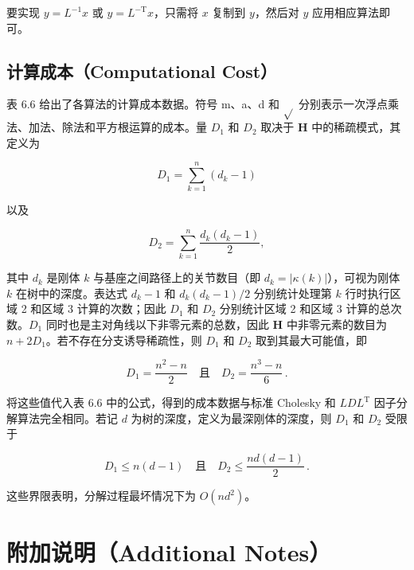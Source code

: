 \documentclass[10pt,a4paper]{book}
\theoremstyle{thmstyle} %
\theoremstyle{defstyle} %
\theoremstyle{prostyle} %
\begin{document}
要实现 $y = L^{-1}x$ 或 $y = L^{-\mathrm{T}}x$，只需将 $x$ 复制到 $y$，然后对 $y$ 应用相应算法即可。



\subsection{计算成本（Computational Cost）}





表 6.6 给出了各算法的计算成本数据。符号 m、a、d 和 $\sqrt{}$ 分别表示一次浮点乘法、加法、除法和平方根运算的成本。量 $D_{1}$ 和 $D_{2}$ 取决于 $\mathbf{H}$ 中的稀疏模式，其定义为



$$
D_{1} = \sum _ { k = 1 } ^{n} ( d _ { k } - 1 )
$$



以及



$$
D_{2} = \sum _ { k = 1 } ^{n} \frac { d _ { k } ( d _ { k } - 1 ) } { 2 } ,
$$



其中 $d_{k}$ 是刚体 $k$ 与基座之间路径上的关节数目（即 $d_{k}=|\kappa(k)|$），可视为刚体 $k$ 在树中的深度。表达式 $d_{k}-1$ 和 $d_{k}(d_{k}-1)/2$ 分别统计处理第 $k$ 行时执行区域 2 和区域 3 计算的次数；因此 $D_{1}$ 和 $D_{2}$ 分别统计区域 2 和区域 3 计算的总次数。$D_{1}$ 同时也是主对角线以下非零元素的总数，因此 $\mathbf{H}$ 中非零元素的数目为 $n+2D_{1}$。若不存在分支诱导稀疏性，则 $D_{1}$ 和 $D_{2}$ 取到其最大可能值，即



$$
D_{1} = \frac{n^{2} - n}{2} \quad \text{且} \quad D_{2} = \frac{n^{3} - n}{6} \, .
$$



将这些值代入表 6.6 中的公式，得到的成本数据与标准 Cholesky 和 $LDL^{\mathrm{T}}$ 因子分解算法完全相同。若记 $d$ 为树的深度，定义为最深刚体的深度，则 $D_{1}$ 和 $D_{2}$ 受限于



$$
D_{1} \leq n ( d - 1 ) \quad \text{且} \quad D_{2} \leq \frac{ n d ( d - 1 ) }{ 2 } \, .
$$



这些界限表明，分解过程最坏情况下为 $O(nd^2)$。



\section{附加说明（Additional Notes）}
\end{document}
